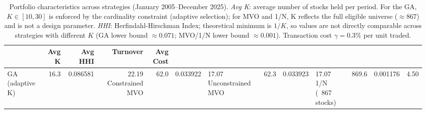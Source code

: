 \begin{table}
\caption{Portfolio characteristics across strategies (January 2005--December 2025). \textit{Avg K}: average number of stocks held per period. For the GA, $K \in [10, 30]$ is enforced by the cardinality constraint (adaptive selection); for MVO and 1/N, K reflects the full eligible universe ($\approx 867$) and is not a design parameter. \textit{HHI}: Herfindahl-Hirschman Index; theoretical minimum is $1/K$, so values are not directly comparable across strategies with different $K$ (GA lower bound $\approx 0.071$; MVO/1/N lower bound $\approx 0.001$). Transaction cost $\gamma = 0.3\%$ per unit traded.}
\label{tab:characteristics}
\begin{tabular}{lrrrr}
\toprule
 & Avg K & Avg HHI & Turnover & Avg Cost \\
\midrule
GA (adaptive K) & 16.3 & 0.086581 & 22.19%
Constrained MVO & 62.0 & 0.033922 & 17.07%
Unconstrained MVO & 62.3 & 0.033923 & 17.07%
1/N (~867 stocks) & 869.6 & 0.001176 & 4.50%
\bottomrule
\end{tabular}
\end{table}
